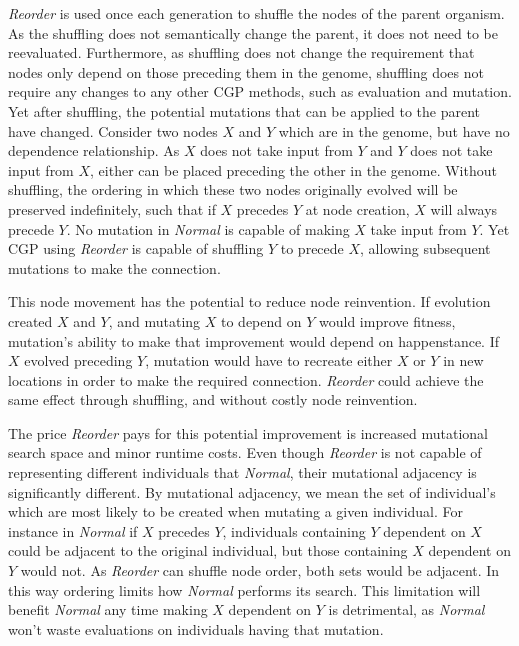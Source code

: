 \documentclass[journal]{IEEEtran}
\begin{document}
\emph{Reorder} is used once each generation to shuffle the nodes of the parent
organism.  As the shuffling does not semantically change the parent, it does
not need to be reevaluated.  Furthermore, as shuffling does not change the requirement
that nodes only depend on those preceding them in the genome, shuffling does not
require any changes to any other CGP methods, such as evaluation and mutation.
Yet after shuffling, the potential mutations that can be applied to the parent
have changed.  Consider two nodes $X$ and $Y$ which are in the genome, but
have no dependence relationship.  As $X$ does not take input from $Y$ and
$Y$ does not take input from $X$, either can be placed preceding the other
in the genome.  Without shuffling, the ordering in which these two nodes originally
evolved will be preserved indefinitely, such that if $X$ precedes $Y$ at node creation,
$X$ will always precede $Y$.  No mutation in \emph{Normal} is capable of making $X$
take input from $Y$.  Yet CGP using \emph{Reorder} is capable of shuffling $Y$ to
precede $X$, allowing subsequent mutations to make the connection.

This node movement has the potential to reduce node reinvention.  If evolution created
$X$ and $Y$, and mutating $X$ to depend on $Y$ would improve fitness, mutation's
ability to make that improvement would depend on happenstance.  If $X$ evolved
preceding $Y$, mutation would have to recreate either $X$ or $Y$ in new locations
in order to make the required connection.  \emph{Reorder} could achieve the same
effect through shuffling, and without costly node reinvention.

The price \emph{Reorder} pays for this potential improvement is increased mutational search
space and minor runtime costs.  Even though \emph{Reorder} is not capable of representing
different individuals that \emph{Normal}, their mutational adjacency is significantly different.
By mutational adjacency, we mean the set of individual's which are most likely to be created
when mutating a given individual.  For instance in \emph{Normal} if $X$ precedes $Y$, individuals
containing $Y$ dependent on $X$ could be adjacent to the original individual, but those containing
$X$ dependent on $Y$ would not.  As \emph{Reorder} can shuffle node order, both sets would be
adjacent.  In this way ordering limits how \emph{Normal} performs its search.  This limitation
will benefit \emph{Normal} any time making $X$ dependent on $Y$ is detrimental, as
\emph{Normal} won't waste evaluations on individuals having that mutation.
\end{document}
